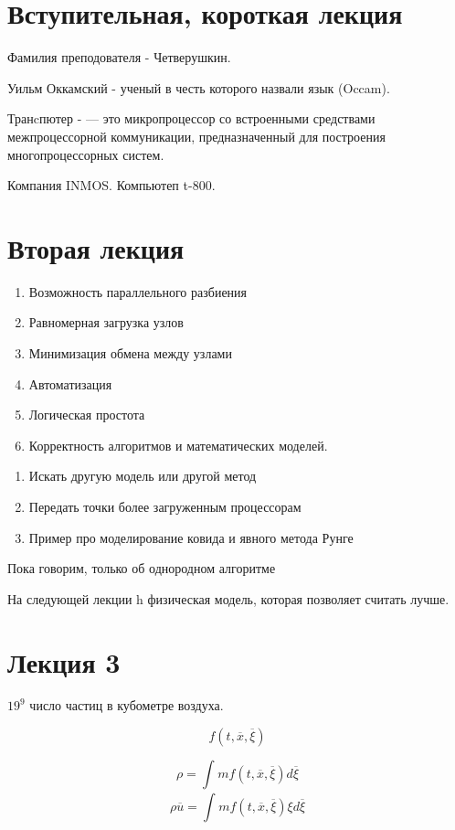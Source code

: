 \documentclass{article}
\begin{document}
\section{Вступительная, короткая лекция}

Фамилия преподователя - Четверушкин.

Уильм Оккамский - ученый в честь которого назвали язык (Occam).

Транcпютер - — это микропроцессор со встроенными средствами межпроцессорной коммуникации, предназначенный для построения многопроцессорных систем.

Компания INMOS. Компьютеп t-800.

\section{Вторая лекция}

\begin{enumerate}
	\item Возможность параллельного разбиения
	\item Равномерная загрузка узлов
	\item Минимизация обмена между узлами
	\item Автоматизация
	\item Логическая простота
	\item Корректность алгоритмов и математических моделей.
\end{enumerate}

\begin{enumerate}
	\item Искать другую модель или другой метод
	\item Передать точки более загруженным процессорам
	\item Пример про моделирование ковида и явного метода Рунге
\end{enumerate} 

Пока говорим, только об однородном алгоритме

На следующей лекции h физическая модель, которая позволяет считать лучше.

\section{Лекция 3}

$ 19^9 $ число частиц в кубометре воздуха.

\[ f(t, \overline{x}, \overline{\xi }) \]

\[ \rho = \int_{}^{} mf(t, \overline{x}, \overline{\xi }) d \overline{\xi  } \]
\[ \rho \overline{u} = \int_{}^{} mf(t, \overline{x}, \overline{\xi }) \xi    d \overline{\xi  } \]
\end{document}
